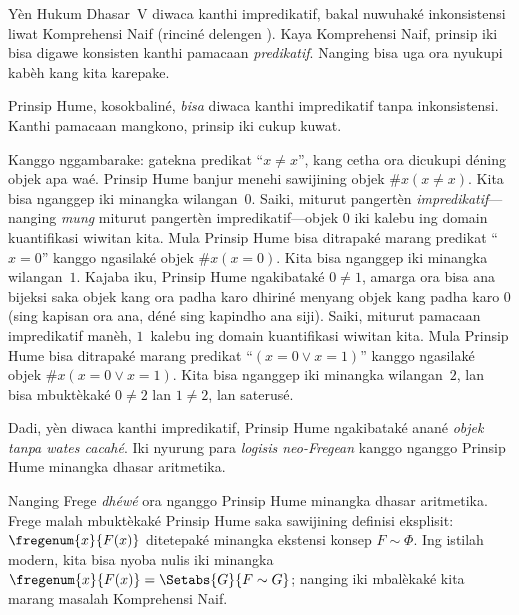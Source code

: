 \documentclass[../../../include/open-logic-section]{subfiles}
\begin{document}
Yèn Hukum Dhasar~V diwaca kanthi impredikatif, bakal
nuwuhaké inkonsistensi liwat Komprehensi Naif (rinciné
delengen ). Kaya Komprehensi Naif,
prinsip iki bisa digawe konsisten kanthi pamacaan
\emph{predikatif}. Nanging bisa uga ora nyukupi kabèh
kang kita karepake.

Prinsip Hume, kosokbaliné, \emph{bisa} diwaca kanthi
impredikatif tanpa inkonsistensi. Kanthi pamacaan mangkono,
prinsip iki cukup kuwat.

Kanggo nggambarake: gatekna predikat “$x \neq x$”,
kang cetha ora dicukupi déning objek apa waé. Prinsip
Hume banjur menehi sawijining objek $\# x( x\neq
x)$. Kita bisa nganggep iki minangka wilangan~$0$. Saiki,
miturut pangertèn \emph{impredikatif}---nanging
\emph{mung} miturut pangertèn impredikatif---objek $0$ iki
kalebu ing domain kuantifikasi wiwitan kita. Mula Prinsip
Hume bisa ditrapaké marang predikat “$x = 0$” kanggo
ngasilaké objek $\#x (x =
0)$. Kita bisa nganggep iki minangka wilangan~$1$.
Kajaba iku, Prinsip Hume ngakibataké $0 \neq 1$,
amarga ora bisa ana bijeksi saka objek kang ora padha
karo dhiriné menyang objek kang padha karo $0$
(sing kapisan ora ana, déné sing kapindho ana siji).
Saiki, miturut pamacaan impredikatif manèh, $1$~kalebu
ing domain kuantifikasi wiwitan kita. Mula Prinsip Hume
bisa ditrapaké marang predikat “$(x = 0 \lor x = 1)$”
kanggo ngasilaké objek $\#x(x = 0 \lor
x = 1)$. Kita bisa nganggep iki minangka wilangan~$2$,
lan bisa mbuktèkaké $0\neq 2$ lan $1 \neq 2$, lan saterusé.

Dadi, yèn diwaca kanthi impredikatif, Prinsip Hume
ngakibataké anané \emph{objek tanpa wates cacahé}.
Iki nyurung para \emph{logisis neo-Fregean} kanggo
nganggo Prinsip Hume minangka dhasar aritmetika.

Nanging Frege \emph{dhéwé} ora nganggo Prinsip Hume
minangka dhasar aritmetika. Frege malah mbuktèkaké
Prinsip Hume saka sawijining definisi eksplisit:
$\fregenum{x}{F(x)}$ ditetepaké minangka ekstensi
konsep $F \sim \Phi$. Ing istilah modern, kita bisa
nyoba nulis iki minangka
$\fregenum{x}{F(x)} = \Setabs{G}{F \sim G}$;
nanging iki mbalèkaké kita marang masalah Komprehensi Naif.
\end{document}
